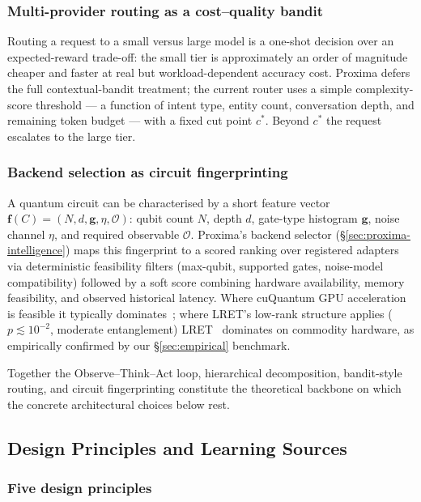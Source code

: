 \documentclass[11pt,a4paper]{article}
\begin{document}
\subsubsection*{Multi-provider routing as a cost--quality bandit}

Routing a request to a small versus large model is a one-shot decision over an
expected-reward trade-off: the small tier is approximately an order of magnitude
cheaper and faster at real but workload-dependent accuracy cost. Proxima defers
the full contextual-bandit treatment; the current router uses a simple
complexity-score threshold --- a function of intent type, entity count,
conversation depth, and remaining token budget --- with a fixed cut point $c^{*}$.
Beyond $c^{*}$ the request escalates to the large tier.

\subsubsection*{Backend selection as circuit fingerprinting}

A quantum circuit can be characterised by a short feature vector
$\mathbf{f}(C) = (N, d, \mathbf{g}, \eta, \mathcal{O})$: qubit count $N$, depth
$d$, gate-type histogram $\mathbf{g}$, noise channel $\eta$, and required
observable $\mathcal{O}$. Proxima's backend selector
(\S\ref{sec:proxima-intelligence}) maps this fingerprint to a scored ranking over
registered adapters via deterministic feasibility filters (max-qubit, supported
gates, noise-model compatibility) followed by a soft score combining hardware
availability, memory feasibility, and observed historical latency. Where
cuQuantum GPU acceleration is feasible it typically
dominates~\cite{bayraktar2023cuquantum}; where LRET's low-rank structure applies
($p \lesssim 10^{-2}$, moderate entanglement) LRET~\cite{chen2021lret} dominates
on commodity hardware, as empirically confirmed by our §\ref{sec:empirical}
benchmark.

Together the Observe--Think--Act loop, hierarchical decomposition, bandit-style
routing, and circuit fingerprinting constitute the theoretical backbone on which
the concrete architectural choices below rest.

\subsection{Design Principles and Learning Sources}

\subsubsection*{Five design principles}
\end{document}
